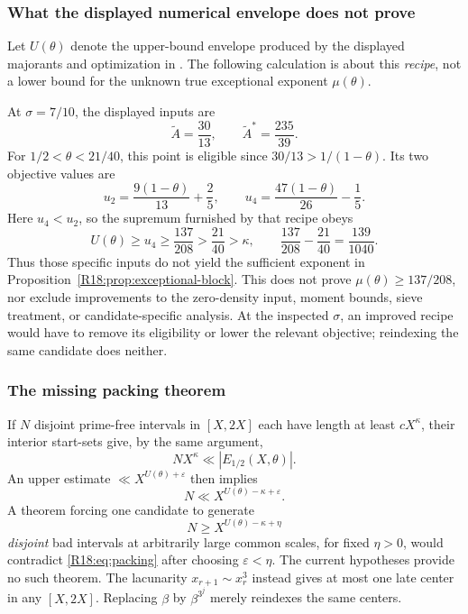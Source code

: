 \documentclass[11pt,a4paper]{article}
\theoremstyle{definition}\newtheorem{definition}[theorem]{Definition}
\theoremstyle{remark}\newtheorem{remark}[theorem]{Remark}
\begin{document}
\subsubsection{What the displayed numerical envelope does not prove}

Let $U(\theta)$ denote the upper-bound envelope produced by the
displayed majorants and optimization in \cite[Tables 1--2 and
Theorem 1.3]{R18-GT2026}. The following calculation is about this
\emph{recipe}, not a lower bound for the unknown true exceptional
exponent $\mu(\theta)$.

At $\sigma=7/10$, the displayed inputs are
\[
 \widetilde A=\frac{30}{13},\qquad
 \widetilde A^*=\frac{235}{39}.
\]
For $1/2<\theta<21/40$, this point is eligible since
$30/13>1/(1-\theta)$. Its two objective values are
\[
 u_2=\frac{9(1-\theta)}{13}+\frac25,\qquad
 u_4=\frac{47(1-\theta)}{26}-\frac15.
\]
Here $u_4<u_2$, so the supremum furnished by that recipe obeys
\begin{equation}\label{R18:eq:envelope}
 U(\theta)\ge u_4\ge\frac{137}{208}
 >\frac{21}{40}>\kappa,
 \qquad
 \frac{137}{208}-\frac{21}{40}=\frac{139}{1040}.
\end{equation}
Thus those specific inputs do not yield the sufficient exponent in
Proposition~\ref{R18:prop:exceptional-block}. This does not prove
$\mu(\theta)\ge137/208$, nor exclude improvements to the
zero-density input, moment bounds, sieve treatment, or
candidate-specific analysis. At the inspected $\sigma$, an improved
recipe would have to remove its eligibility or lower the relevant
objective; reindexing the same candidate does neither.

\subsubsection{The missing packing theorem}

If $N$ disjoint prime-free intervals in $[X,2X]$ each have length
at least $cX^\kappa$, their interior start-sets give, by the same
argument,
\[
 NX^\kappa\ll|E_{1/2}(X,\theta)|.
\]
An upper estimate $\ll X^{U(\theta)+\varepsilon}$ then implies
\begin{equation}\label{R18:eq:packing}
 N\ll X^{U(\theta)-\kappa+\varepsilon}.
\end{equation}
A theorem forcing one candidate to generate
\[
 N\ge X^{U(\theta)-\kappa+\eta}
\]
\emph{disjoint} bad intervals at arbitrarily large common scales,
for fixed $\eta>0$, would contradict \eqref{R18:eq:packing} after
choosing $\varepsilon<\eta$. The current hypotheses provide no
such theorem. The lacunarity $x_{r+1}\sim x_r^3$ instead gives at
most one late center in any $[X,2X]$. Replacing $\beta$ by
$\beta^{3^j}$ merely reindexes the same centers.
\end{document}
